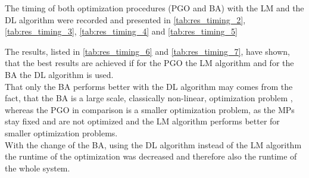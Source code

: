 The timing of both optimization procedures (\ac{PGO} and \ac{BA}) with the \ac{LM} and the \ac{DL} algorithm were recorded and presented in \autoref{tab:res_timing_2}, \autoref{tab:res_timing_3}, \autoref{tab:res_timing_4} and \autoref{tab:res_timing_5}

The results, listed in \autoref{tab:res_timing_6} and \autoref{tab:res_timing_7}, have shown, that the best results are achieved if for the \ac{PGO} the \ac{LM} algorithm and for the \ac{BA} the \ac{DL} algorithm is used.\\

That only the \ac{BA} performs better with the \ac{DL} algorithm may comes from the fact, that the \ac{BA} is a large scale, classically non-linear, optimization problem \cite{Lourakis2005, Triggs2000}, whereas the \ac{PGO} in comparison is a smaller optimization problem, as the \acp{MP} stay fixed and are not optimized and the \ac{LM} algorithm performs better for smaller optimization problems.\\

With the change of the \ac{BA}, using the \ac{DL} algorithm instead of the \ac{LM} algorithm the runtime of the optimization was decreased and therefore also the runtime of the whole system.

